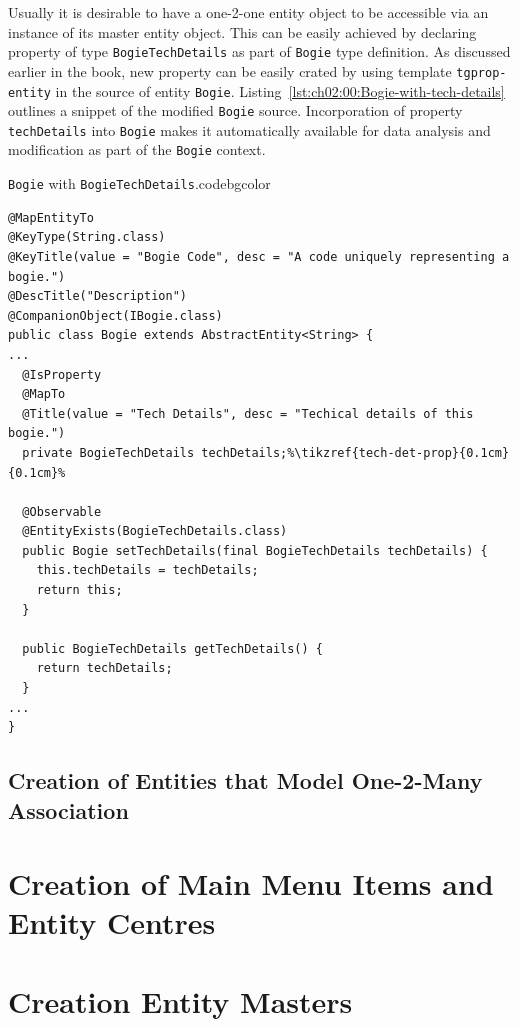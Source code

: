   Usually it is desirable to have a one-2-one entity object to be accessible via an instance of its master entity object.
  This can be easily achieved by declaring property of type \texttt{BogieTechDetails} as part of \texttt{Bogie} type definition.
  As discussed earlier in the book, new property can be easily crated by using template \texttt{tgprop-entity} in the source of entity \texttt{Bogie}.
  Listing~\ref{lst:ch02:00:Bogie-with-tech-details} outlines a snippet of the modified \texttt{Bogie} source.
  Incorporation of property \texttt{techDetails} into \texttt{Bogie} makes it automatically available for data analysis and modification as part of the \texttt{Bogie} context.
  
  \begin{code}{\texttt{Bogie} with \texttt{BogieTechDetails}.}{\label{lst:ch02:00:Bogie-with-tech-details}}{codebgcolor}
  \begin{lstlisting}
@MapEntityTo
@KeyType(String.class)
@KeyTitle(value = "Bogie Code", desc = "A code uniquely representing a bogie.")
@DescTitle("Description")
@CompanionObject(IBogie.class)
public class Bogie extends AbstractEntity<String> { 
...
  @IsProperty
  @MapTo
  @Title(value = "Tech Details", desc = "Techical details of this bogie.")
  private BogieTechDetails techDetails;%\tikzref{tech-det-prop}{0.1cm}{0.1cm}%

  @Observable
  @EntityExists(BogieTechDetails.class)
  public Bogie setTechDetails(final BogieTechDetails techDetails) {
    this.techDetails = techDetails;
    return this;
  }

  public BogieTechDetails getTechDetails() {
    return techDetails;
  }
...    
}    
  \end{lstlisting}
\end{code}      

    
  \subsection{Creation of Entities that Model One-2-Many Association}  
  
\section{Creation of Main Menu Items and Entity Centres}  
  
  
\section{Creation Entity Masters}
  
